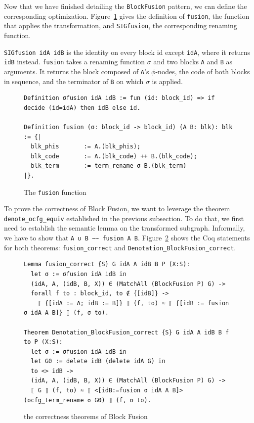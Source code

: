 \documentclass[11pt]{article}
\newcommand{\inlinecoq}[1]{\mbox{\lstinline[style=customcoq,columns=fixed,basewidth=.48em]{#1}}}
\newcommand{\ilc}[1]{\inlinecoq{#1}}
\begin{document}
Now that we have finished detailing the \ilc{BlockFusion} pattern, we can define the corresponding optimization. Figure~\ref{fig:fusion} gives the definition of \ilc{fusion}, the function that applies the transformation, and \ilc{SIGfusion}, the corresponding renaming function.

\ilc{SIGfusion idA idB} is the identity on every block id except \ilc{idA}, where it returns \ilc{idB} instead. \ilc{fusion} takes a renaming function $\sigma$ and two blocks \ilc{A} and \ilc{B} as arguments. It returns the block composed of \ilc{A}'s $\phi$-nodes, the code of both blocks in sequence, and the terminator of \ilc{B} on which $\sigma$ is applied.

\begin{figure}
  \begin{lstlisting}[style=customcoq,basicstyle=\small\ttfamily]
Definition σfusion idA idB := fun (id: block_id) => if decide (id=idA) then idB else id.

Definition fusion (σ: block_id -> block_id) (A B: blk): blk := {|
  blk_phis       := A.(blk_phis);
  blk_code       := A.(blk_code) ++ B.(blk_code);
  blk_term       := term_rename σ B.(blk_term)
|}.
  \end{lstlisting}
  \caption{The \ilc{fusion} function}
  \label{fig:fusion}
\end{figure}

To prove the correctness of Block Fusion, we want to leverage the theorem \ilc{denote_ocfg_equiv} established in the previous subsection. To do that, we first need to establish the semantic lemma on the transformed subgraph. Informally, we have to show that \ilc{A ∪ B ~~ fusion A B}. Figure~\ref{fig:fusion_proof} shows the Coq statements for both theorems: \ilc{fusion_correct} and \ilc{Denotation_BlockFusion_correct}.

\begin{figure}
  \begin{lstlisting}[style=customcoq,basicstyle=\small\ttfamily]
Lemma fusion_correct {S} G idA A idB B P (X:S):
  let σ := σfusion idA idB in
  (idA, A, (idB, B, X)) ∈ (MatchAll (BlockFusion P) G) ->
  forall f to : block_id, to ∉ {[idB]} ->
    ⟦ {[idA := A; idB := B]} ⟧ (f, to) ≈ ⟦ {[idB := fusion σ idA A B]} ⟧ (f, σ to).

Theorem Denotation_BlockFusion_correct {S} G idA A idB B f to P (X:S):
  let σ := σfusion idA idB in
  let G0 := delete idB (delete idA G) in
  to <> idB ->
  (idA, A, (idB, B, X)) ∈ (MatchAll (BlockFusion P) G) ->
  ⟦ G ⟧ (f, to) ≈ ⟦ <[idB:=fusion σ idA A B]> (ocfg_term_rename σ G0) ⟧ (f, σ to).
      \end{lstlisting}
      \caption{the correctness theorems of Block Fusion}
      \label{fig:fusion_proof}
\end{figure}
\end{document}
